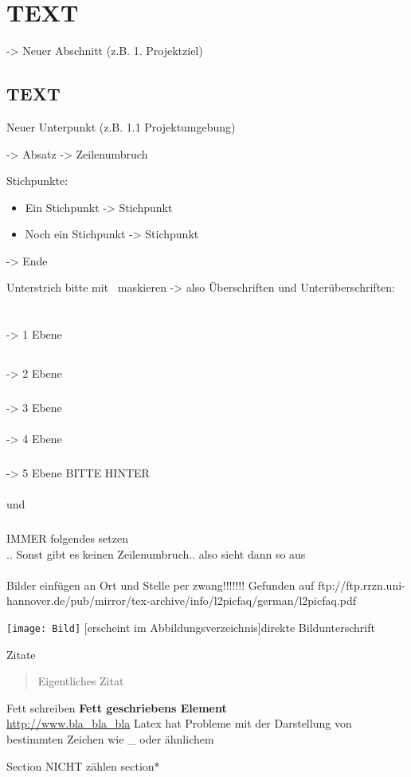 \section{TEXT} -> Neuer Abschnitt (z.B. 1. Projektziel)
\subsection{TEXT} Neuer Unterpunkt (z.B. 1.1 Projektumgebung)
\par\bigskip -> Absatz
\newline -> Zeilenumbruch

Stichpunkte:
\begin{itemize} -> Start
\item Ein Stichpunkt -> Stichpunkt
\item Noch ein Stichpunkt -> Stichpunkt
\end{itemize} -> Ende

Unterstrich bitte mit \ maskieren -> also \-
Überschriften und Unterüberschriften:
\section{} -> 1 Ebene
\subsection{} -> 2 Ebene
\subsubsection{} -> 3 Ebene
\paragraph{} -> 4 Ebene
\subparagraph{} -> 5 Ebene
BITTE HINTER \paragraph{} und \subparagraph{} IMMER folgendes setzen $\;$\\.. Sonst gibt es keinen
Zeilenumbruch.. also sieht dann so aus \paragraph{}$\;$\\

Bilder einfügen an Ort und Stelle per zwang!!!!!!! Gefunden auf ftp://ftp.rrzn.uni-hannover.de/pub/mirror/tex-archive/info/l2picfaq/german/l2picfaq.pdf
\begin{center}
\begin{minipage}{0.7\linewidth}
\centering
\texttt{[image: Bild]}%
[erscheint im Abbildungsverzeichnis]{direkte Bildunterschrift}%
\end{minipage}
\end{center}

Zitate
\begin{quote}
 Eigentliches Zitat
\end{quote}

Fett schreiben
\textbf{Fett geschriebens Element}\\

\url{http://www.bla_bla_bla}
Latex hat Probleme mit der Darstellung von bestimmten Zeichen wie _ oder ähnlichem

Section NICHT zählen section*{}



